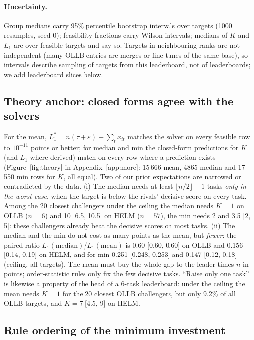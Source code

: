 \paragraph{Uncertainty.}
Group medians carry 95\% percentile bootstrap intervals over targets (1000 resamples, seed 0); feasibility fractions carry Wilson intervals; medians of $K$ and $L_1$ are over feasible targets and say so.
Targets in neighbouring ranks are not independent (many OLLB entries are merges or fine-tunes of the same base), so intervals describe sampling of targets from this leaderboard, not of leaderboards; we add leaderboard slices below.

\subsection{Theory anchor: closed forms agree with the solvers}
\label{sec:exp-theory}
For the mean, $L_1^\ast=n(\tau+\varepsilon)-\sum_t x_{it}$ matches the solver on every feasible row to $10^{-11}$ points or better; for median and min the closed-form predictions for $K$ (and $L_1$ where derived) match on every row where a prediction exists (Figure~\ref{fig:theory} in Appendix~\ref{app:more}: 15\,666 mean, 4865 median and 17\,550 min rows for $K$, all equal).
Two of our prior expectations are narrowed or contradicted by the data.
(i) The median needs at least $\lfloor n/2\rfloor+1$ tasks \emph{only in the worst case}, when the target is below the rivals' decisive score on every task. Among the 20 closest challengers under the ceiling the median needs $K=1$ on OLLB ($n=6$) and 10 [6.5, 10.5] on HELM ($n=57$), the min needs 2 and 3.5 [2, 5]: these challengers already beat the decisive scores on most tasks.
(ii) The median and the min do not cost as many points as the mean, but \emph{fewer}: the paired ratio $L_1(\text{median})/L_1(\text{mean})$ is 0.60 [0.60, 0.60] on OLLB and 0.156 [0.14, 0.19] on HELM, and for min 0.251 [0.248, 0.253] and 0.147 [0.12, 0.18] (ceiling, all targets).
The mean must buy the whole gap to the leader times $n$ in points; order-statistic rules only fix the few decisive tasks.
``Raise only one task'' is likewise a property of the head of a 6-task leaderboard: under the ceiling the mean needs $K=1$ for the 20 closest OLLB challengers, but only 9.2\% of all OLLB targets, and $K=7$ [4.5, 9] on HELM.

\subsection{Rule ordering of the minimum investment}
\label{sec:exp-rules}

